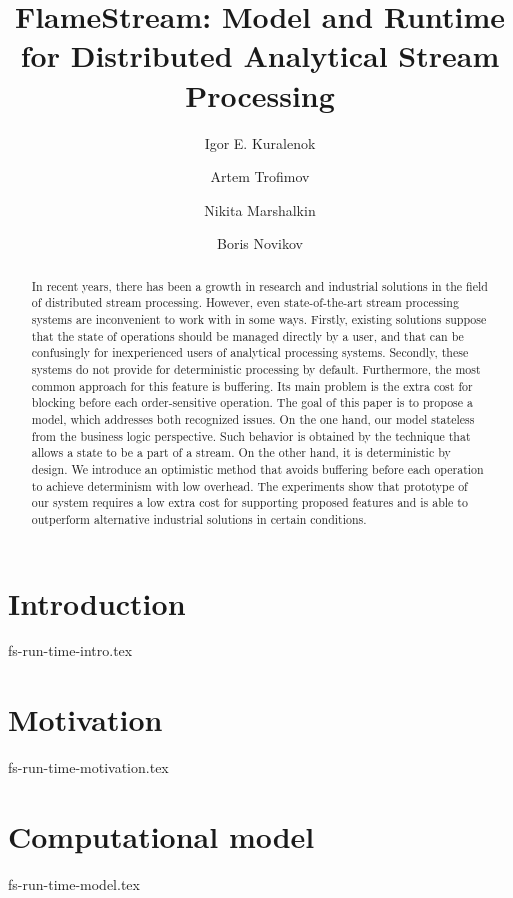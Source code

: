 \documentclass{llncs}
\newcommand {\FlameStream} {FlameStream}
\begin{document}
\title {\FlameStream: Model and Runtime for Distributed Analytical Stream Processing}
\author{Igor E. Kuralenok \and Artem Trofimov \and Nikita Marshalkin \and Boris Novikov}

\maketitle
{}

\begin{abstract}
In recent years, there has been a growth in research and industrial solutions in the field of distributed stream processing. However, even state-of-the-art stream processing systems are inconvenient to work with in some ways. Firstly, existing solutions suppose that the state of operations should be managed directly by a user, and that can be confusingly for inexperienced users of analytical processing systems. Secondly, these systems do not provide for deterministic processing by default. Furthermore, the most common approach for this feature is buffering. Its main problem is the extra cost for blocking before each order-sensitive operation. The goal of this paper is to propose a model, which addresses both recognized issues. On the one hand, our model stateless from the business logic perspective. Such behavior is obtained by the technique that allows a state to be a part of a stream. On the other hand, it is deterministic by design. We introduce an optimistic method that avoids buffering before each operation to achieve determinism with low overhead. The experiments show that prototype of our system requires a low extra cost for supporting proposed features and is able to outperform alternative industrial solutions in certain conditions.
\end {abstract}

\section {Introduction}
 {fs-run-time-intro.tex}

\section {Motivation}
 {fs-run-time-motivation.tex}

\section {Computational model}
 {fs-run-time-model.tex}
\end{document}
